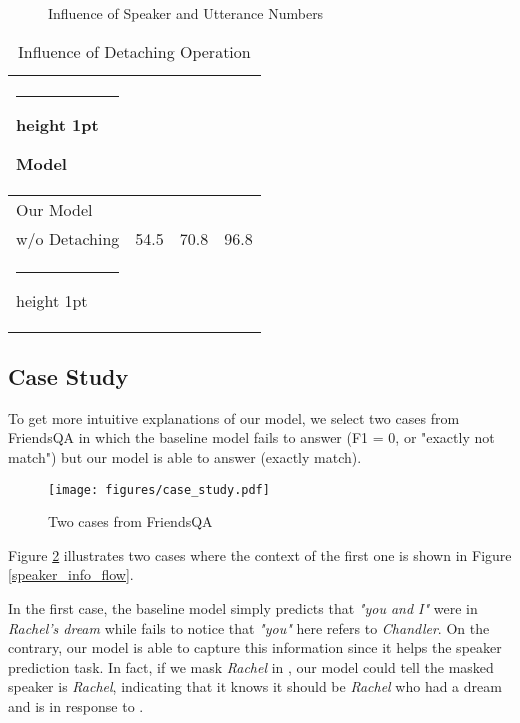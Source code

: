 \documentclass[11pt]{article}
\makeatletter
\newcommand{\thickhline}{\noalign {\ifnum 0=`}\fi \hrule height 1pt
	\futurelet \reserved@a \@xhline
}
\makeatother
\begin{document}
	\begin{figure}[tbp]
		\centering
		
		\caption{Influence of Speaker and Utterance Numbers}
		\label{number_study}
	\end{figure}
	
	
	\begin{table}[tbp]
		\centering
		\begin{tabular}{l c c c}
			\thickhline
			Model &  &  & \\
			\hline \hline
			Our Model &  &  & \\
			\quad w/o Detaching & 54.5 & 70.8 & 96.8\\
			\thickhline
		\end{tabular}
		\caption{Influence of Detaching Operation}
		\label{Detach}
	\end{table}
	
	\subsection{Case Study}
	To get more intuitive explanations of our model, we select two cases from FriendsQA in which the baseline model fails to answer (F1 = 0, or "exactly not match") but our model is able to answer (exactly match).
	\begin{figure}[tbp]
		\texttt{[image: figures/case\_study.pdf]}
		\centering
		\caption{Two cases from FriendsQA} 
		\label{case_study_pic}
	\end{figure}
	Figure \ref{case_study_pic} illustrates two cases where the context of the first one is shown in Figure \ref{speaker_info_flow}.
	
	In the first case, the baseline model simply predicts that \emph{"you and I"} were in \emph{Rachel's dream} while fails to notice that \emph{"you"} here refers to \emph{Chandler}. On the contrary, our model is able to capture this information since it helps the speaker prediction task. In fact, if we mask \emph{Rachel} in , our model could tell the masked speaker is \emph{Rachel}, indicating that it knows it should be \emph{Rachel} who had a dream and  is in response to .
	
\end{document}
